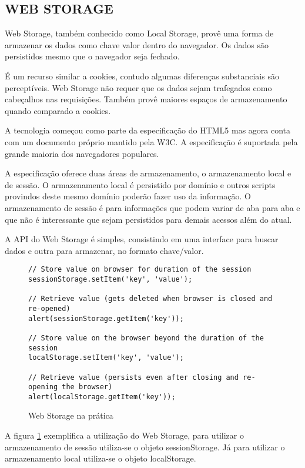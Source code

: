 \subsection{WEB STORAGE}

Web Storage, também conhecido como Local Storage, provê uma forma de
armazenar os dados como chave valor dentro do navegador. Os dados são
persistidos mesmo que o navegador seja fechado.

É um recurso similar a cookies, contudo algumas diferenças
substanciais são perceptíveis. Web Storage não requer que os dados
sejam trafegados como cabeçalhos nas requisições. Também provê
maiores espaços de armazenamento quando comparado a cookies.

A tecnologia começou como parte da especificação do HTML5 mas agora
conta com um documento próprio mantido pela W3C. A especificação é
suportada pela grande maioria dos navegadores populares.

A especificação oferece duas áreas de armazenamento, o armazenamento
local e de sessão. O armazenamento local é persistido por domínio
e outros scripts provindos deste mesmo domínio poderão fazer uso da
informação. O armazenamento de sessão é para informações que podem
variar de aba para aba e que não é interessante que sejam persistidos
para demais acessos além do atual.

A API do Web Storage é simples, consistindo em uma interface para
buscar dados e outra para armazenar, no formato chave/valor.

\begin{figure}
\centering
\begin{verbatim}
// Store value on browser for duration of the session
sessionStorage.setItem('key', 'value');

// Retrieve value (gets deleted when browser is closed and re-opened)
alert(sessionStorage.getItem('key'));

// Store value on the browser beyond the duration of the session
localStorage.setItem('key', 'value');

// Retrieve value (persists even after closing and re-opening the browser)
alert(localStorage.getItem('key'));

\end{verbatim}
\caption{Web Storage na prática}
\label{fig:WebStorage}
\end{figure}

A figura \ref{fig:WebStorage} exemplifica a utilização do Web Storage,
para utilizar o armazenamento de sessão utiliza-se o objeto sessionStorage. Já
para utilizar o armazenamento local utiliza-se o objeto localStorage.

